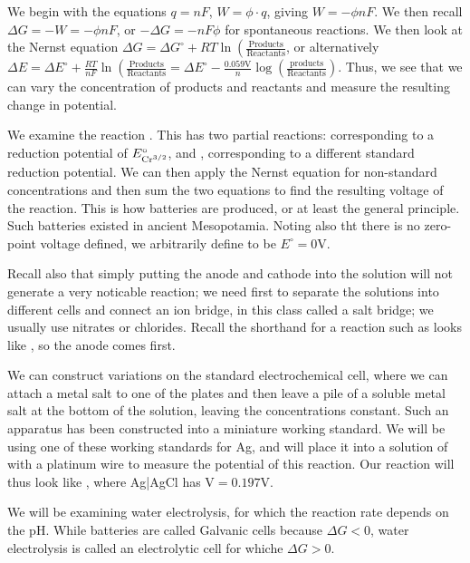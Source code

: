 \documentclass{report}
\begin{document}
We begin with the equations $q = nF$, $W = \phi \cdot q$, giving $W = -\phi n F$. We then recall $\Delta G = -W = -\phi n F$, or $-\Delta G = -nF\phi$ for spontaneous reactions. We then look at the Nernst equation $\Delta G = \Delta G^\circ + RT \ln\left(\frac{\text{Products}}{\text{Reactants}}$, or alternatively $\Delta E = \Delta E^\circ + \frac{RT}{nF}\ln\left(\frac{\text{Products}}{\text{Reactants}} = \Delta E^\circ - \frac{0.059\mathrm{V}}{n}\log\left(\frac{\text{products}}{\text{Reactants}}\right)$. Thus, we see that we can vary the concentration of products and reactants and measure the resulting change in potential. 

We examine the reaction . This has two partial reactions:  corresponding to a reduction potential of $E^\circ_{\ce{Cr^{3/2}}}$, and , corresponding to a different standard reduction potential. We can then apply the Nernst equation for non-standard concentrations and then sum the two equations to find the resulting voltage of the reaction. This is how batteries are produced, or at least the general principle. Such batteries existed in ancient Mesopotamia. Noting also tht there is no zero-point voltage defined, we arbitrarily define  to be $E^\circ = 0$V. 

Recall also that simply putting the anode and cathode into the solution will not generate a very noticable reaction; we need first to separate the solutions into different cells and connect an ion bridge, in this class called a salt bridge; we usually use nitrates or chlorides. Recall the shorthand for a reaction such as  looks like , so the anode comes first.

We can construct variations on the standard electrochemical cell, where we can attach a metal salt to one of the plates and then leave a pile of a soluble metal salt at the bottom of the solution, leaving the concentrations constant. Such an apparatus has been constructed into a miniature working standard. We will be using one of these working standards for Ag, and will place it into a solution of  with a platinum wire to measure the potential of this reaction. Our reaction will thus look like , where Ag|AgCl has V$=0.197$V. 

We will be examining water electrolysis, for which the reaction rate depends on the pH. While batteries are called Galvanic cells because $\Delta G < 0$, water electrolysis is called an electrolytic cell for whiche $\Delta G > 0$. 
\end{document}
